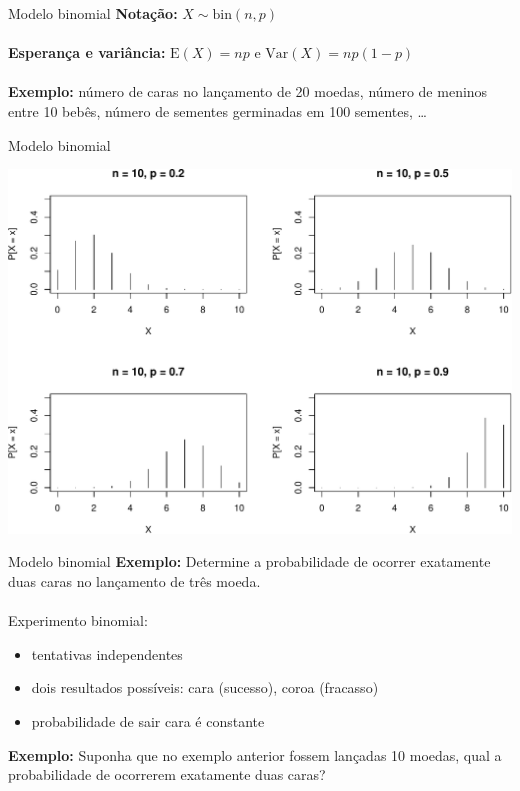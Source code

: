 \documentclass[10pt]{beamer}\usepackage[]{graphicx}\usepackage[]{color}
\newenvironment{knitrout}{}{} %
\providecommand{\E}{\text{E}}
\providecommand{\Var}{\text{Var}}
\theoremstyle{definition}
\begin{document}
\begin{frame}[fragile]{Modelo binomial}
  \textbf{Notação:} $X \sim \text{bin}(n,p)$ \\~\\
  \textbf{Esperança e variância:} $\E(X) = np$ e $\Var(X) = np(1-p)$ \\~\\
  \textbf{Exemplo:} número de caras no lançamento de 20 moedas, número de
  meninos entre 10 bebês, número de sementes germinadas em 100 sementes,
  \ldots
\end{frame}

\begin{frame}[fragile]{Modelo binomial}
\begin{knitrout}\footnotesize
{}\color{fgcolor}

{\centering \includegraphics[width=1\textwidth]{figure/unnamed-chunk-2-1} 

}



\end{knitrout}
\end{frame}

\begin{frame}[fragile]{Modelo binomial}
  \textbf{Exemplo:} Determine a probabilidade de ocorrer exatamente duas
  caras no lançamento de três moeda. \\~\\
  Experimento binomial:
  \begin{itemize}
  \item tentativas independentes
  \item dois resultados possíveis: cara (sucesso), coroa (fracasso)
  \item probabilidade de sair cara é constante
  \end{itemize} \pause
  \vspace{1em}
  \textbf{Exemplo:} Suponha que no exemplo anterior fossem lançadas 10
  moedas, qual a probabilidade de ocorrerem exatamente duas caras?
\end{frame}
\end{document}
